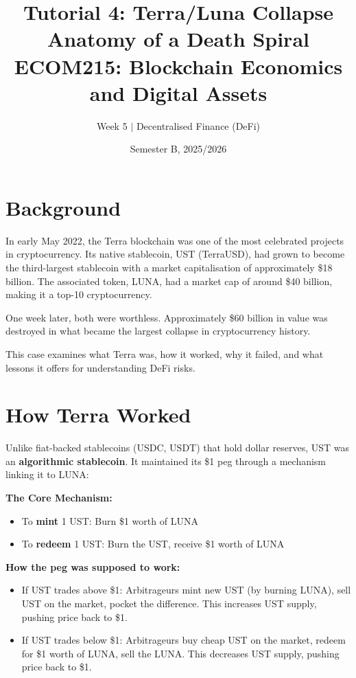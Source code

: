 \documentclass[11pt]{article}
\title{Tutorial 4: Terra/Luna Collapse\\[0.3em] \Large Anatomy of a Death Spiral\\[1em] \normalsize ECOM215: Blockchain Economics and Digital Assets}
\author{Week 5 $\vert$ Decentralised Finance (DeFi)}
\date{Semester B, 2025/2026}
\begin{document}
\maketitle

\vspace{1em}
\begin{center}
\end{center}

\section*{Background}

In early May 2022, the Terra blockchain was one of the most celebrated projects in cryptocurrency. Its native stablecoin, UST (TerraUSD), had grown to become the third-largest stablecoin with a market capitalisation of approximately \$18 billion. The associated token, LUNA, had a market cap of around \$40 billion, making it a top-10 cryptocurrency.

One week later, both were worthless. Approximately \$60 billion in value was destroyed in what became the largest collapse in cryptocurrency history.

This case examines what Terra was, how it worked, why it failed, and what lessons it offers for understanding DeFi risks.

\section*{How Terra Worked}

Unlike fiat-backed stablecoins (USDC, USDT) that hold dollar reserves, UST was an \textbf{algorithmic stablecoin}. It maintained its \$1 peg through a mechanism linking it to LUNA:

\medskip
\noindent\textbf{The Core Mechanism:}
\begin{itemize}[leftmargin=*]
\item To \textbf{mint} 1 UST: Burn \$1 worth of LUNA
\item To \textbf{redeem} 1 UST: Burn the UST, receive \$1 worth of LUNA
\end{itemize}

\medskip
\noindent\textbf{How the peg was supposed to work:}
\begin{itemize}[leftmargin=*]
\item If UST trades above \$1: Arbitrageurs mint new UST (by burning LUNA), sell UST on the market, pocket the difference. This increases UST supply, pushing price back to \$1.
\item If UST trades below \$1: Arbitrageurs buy cheap UST on the market, redeem for \$1 worth of LUNA, sell the LUNA. This decreases UST supply, pushing price back to \$1.
\end{itemize}
\end{document}
